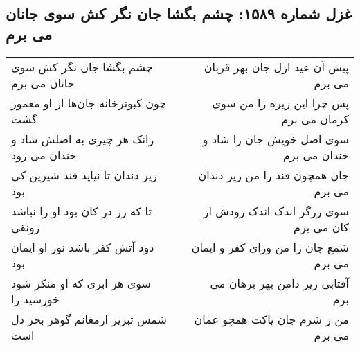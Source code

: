 \begin{center}
\section*{غزل شماره ۱۵۸۹: چشم بگشا جان نگر کش سوی جانان می برم}
\label{sec:1589}
\begin{longtable}{l p{0.5cm} r}
چشم بگشا جان نگر کش سوی جانان می برم
&&
پیش آن عید ازل جان بهر قربان می برم
\\
چون کبوترخانه جان‌ها از او معمور گشت
&&
پس چرا این زیره را من سوی کرمان می برم
\\
زانک هر چیزی به اصلش شاد و خندان می رود
&&
سوی اصل خویش جان را شاد و خندان می برم
\\
زیر دندان تا نیاید قند شیرین کی بود
&&
جان همچون قند را من زیر دندان می برم
\\
تا که زر در کان بود او را نباشد رونقی
&&
سوی زرگر اندک اندک زودش از کان می برم
\\
دود آتش کفر باشد نور او ایمان بود
&&
شمع جان را من ورای کفر و ایمان می برم
\\
سوی هر ابری که او منکر شود خورشید را
&&
آفتابی زیر دامن بهر برهان می برم
\\
شمس تبریز ارمغانم گوهر بحر دل است
&&
من ز شرم جان پاکت همچو عمان می برم
\\
\end{longtable}
\end{center}
